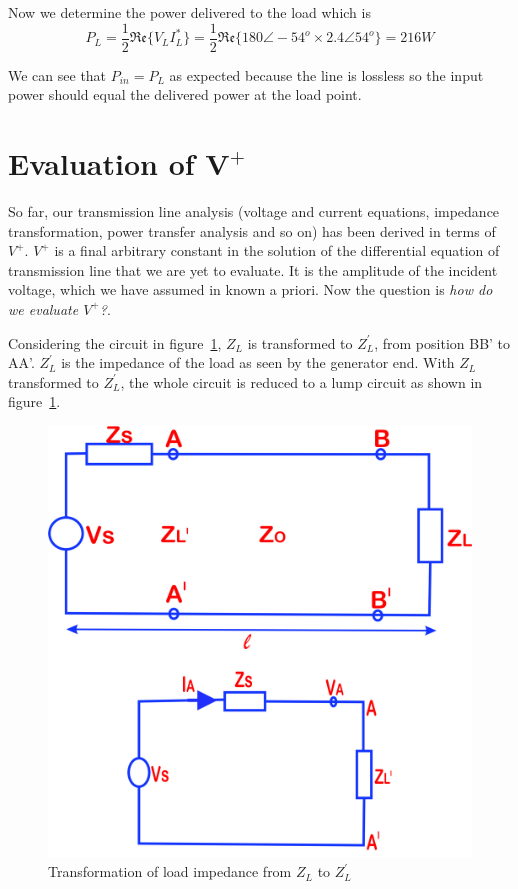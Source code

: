 \begin{exmp}
Now we determine the power delivered to the load which is
\begin{dmath*}
P_L = \frac{1}{2}\mathfrak{Re}\lbrace V_L I_L^\ast\rbrace
= \frac{1}{2}\mathfrak{Re}\lbrace 180\angle-54^o\times 2.4\angle54^o\rbrace
= 216W
\end{dmath*}

We can see that $P_{in} = P_L$ as expected because the line is lossless so the input power should equal the delivered power at the load point.
\end{exmp}

\section{Evaluation of $\mathbf{V^{+}}$}\label{sec:evalvplus}
So far, our transmission line analysis (voltage and current equations, impedance transformation, power transfer analysis and so on) has been derived in terms of $V^+$. $V^+$ is a final arbitrary constant in the solution of the differential equation of transmission line that we are yet to evaluate. It is the amplitude of the incident voltage, which we have assumed in known a priori. Now the question is \emph{how do we evaluate $V^{+}$?}.

Considering the circuit in figure~\ref{fig:qwerrtt}, $Z_L$ is transformed to $Z^{'}_L$, from position BB' to AA'. $Z^{'}_L$ is the impedance of the load as seen by the generator end. With $Z_L$ transformed to $Z^{'}_L$, the whole circuit is reduced to a lump circuit as shown in figure~\ref{fig:qwerrtt}.
\begin{figure}[h]
\centering
\includegraphics[width=0.7\linewidth]{./graphics/qwerrtt fixed}
\caption{Transformation of load impedance from $Z_L$ to $Z_{L}^'$}
\label{fig:qwerrtt}
\end{figure}

